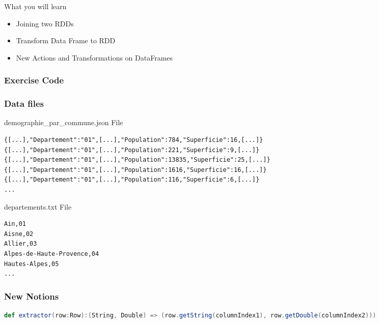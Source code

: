 \documentclass[slidetop,9pt,utf8]{beamer}
\begin{document}
\begin{CJK}{UTF8}{gbsn}
\begin{frame}
  \begin{block}{What you will learn}
    \begin{itemize}
      \item Joining two RDDs
      \item Transform Data Frame to RDD
      \item New Actions and Transformations on DataFrames
    \end{itemize}
  \end{block}

\end{frame}

\begin{frame}
  \frametitle{Exercise Code}

  

\end{frame}

\begin{frame}[fragile]
  \frametitle{Data files}

  \begin{block}{demographie\_par\_commune.json File}
    \begin{verbatim}
{[...],"Departement":"01",[...],"Population":784,"Superficie":16,[...]}
{[...],"Departement":"01",[...],"Population":221,"Superficie":9,[...]}
{[...],"Departement":"01",[...],"Population":13835,"Superficie":25,[...]}
{[...],"Departement":"01",[...],"Population":1616,"Superficie":16,[...]}
{[...],"Departement":"01",[...],"Population":116,"Superficie":6,[...]}
...
    \end{verbatim}
  \end{block}

  \begin{block}{departements.txt File}
    \begin{verbatim}
Ain,01
Aisne,02
Allier,03
Alpes-de-Haute-Provence,04
Hautes-Alpes,05
...
    \end{verbatim}
  \end{block}


\end{frame}

\begin{frame}[fragile]
  \frametitle{New Notions}

  \begin{lstlisting}[label=ExtractValueFromARow, caption=Extract value from a Row, language=scala, style=code]
def extractor(row:Row):(String, Double) => (row.getString(columnIndex1), row.getDouble(columnIndex2)))
  \end{lstlisting}


\end{frame}
\end{CJK}
\end{document}
